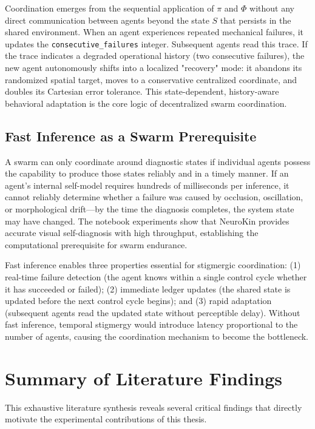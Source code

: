 \documentclass[12pt,a4paper,oneside]{report}
\begin{document}
Coordination emerges from the sequential application of $\pi$ and $\Phi$ without any direct communication between agents beyond the state $S$ that persists in the shared environment. When an agent experiences repeated mechanical failures, it updates the \texttt{consecutive\_failures} integer. Subsequent agents read this trace. If the trace indicates a degraded operational history (two consecutive failures), the new agent autonomously shifts into a localized "recovery" mode: it abandons its randomized spatial target, moves to a conservative centralized coordinate, and doubles its Cartesian error tolerance. This state-dependent, history-aware behavioral adaptation is the core logic of decentralized swarm coordination.

\subsection{Fast Inference as a Swarm Prerequisite}

A swarm can only coordinate around diagnostic states if individual agents possess the capability to produce those states reliably and in a timely manner. If an agent's internal self-model requires hundreds of milliseconds per inference, it cannot reliably determine whether a failure was caused by occlusion, oscillation, or morphological drift—by the time the diagnosis completes, the system state may have changed. The notebook experiments show that NeuroKin provides accurate visual self-diagnosis with high throughput, establishing the computational prerequisite for swarm endurance.

Fast inference enables three properties essential for stigmergic coordination: (1) real-time failure detection (the agent knows within a single control cycle whether it has succeeded or failed); (2) immediate ledger updates (the shared state is updated before the next control cycle begins); and (3) rapid adaptation (subsequent agents read the updated state without perceptible delay). Without fast inference, temporal stigmergy would introduce latency proportional to the number of agents, causing the coordination mechanism to become the bottleneck.

\section{Summary of Literature Findings}

This exhaustive literature synthesis reveals several critical findings that directly motivate the experimental contributions of this thesis.
\end{document}
